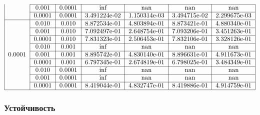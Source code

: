 \documentclass[a4paper,12pt]{article}
\begin{document}
\begin{align*}
\begin{tabular}{|c|c|c|c|c|c|c|}
            \cline{2-7}
            & 0.001 & 0.0001 & inf & nan & nan & nan \\
            \cline{2-7}
            & 0.0001 & 0.0001 & 3.491224e-02 & 1.150314e-03 & 3.494715e-02 & 2.299675e-03 \\
            \hline
            & 0.010 & 0.010 & 8.872534e-01 & 4.803894e-01 & 8.873421e-01 & 4.880340e-01 \\
            \cline{2-7}
            & 0.001 & 0.010 & 7.092497e-01 & 2.648754e-01 & 7.093206e-01 & 3.451263e-01 \\
            \cline{2-7}
            & 0.0001 & 0.010 & 7.831323e-01 & 2.506453e-01 & 7.832106e-01 & 3.328126e-01 \\
            \cline{2-7}
            & 0.010 & 0.001 & inf & nan & nan & nan \\
            \cline{2-7}
            0.0001& 0.001 & 0.001 & 8.895742e-01 & 4.830140e-01 & 8.896631e-01 & 4.911673e-01 \\
            \cline{2-7}
            & 0.0001 & 0.001 & 6.797345e-01 & 2.674819e-01 & 6.798025e-01 & 3.484349e-01 \\
            \cline{2-7}
            & 0.010 & 0.0001 & inf & nan & nan & nan \\
            \cline{2-7}
            & 0.001 & 0.0001 & inf & nan & nan & nan \\
            \cline{2-7}
            & 0.0001 & 0.0001 & 8.419044e-01 & 4.832747e-01 & 8.419886e-01 & 4.914759e-01 \\
            \hline
        \end{tabular}
    \end{align*}


\subsubsection{Устойчивость}
\end{document}
